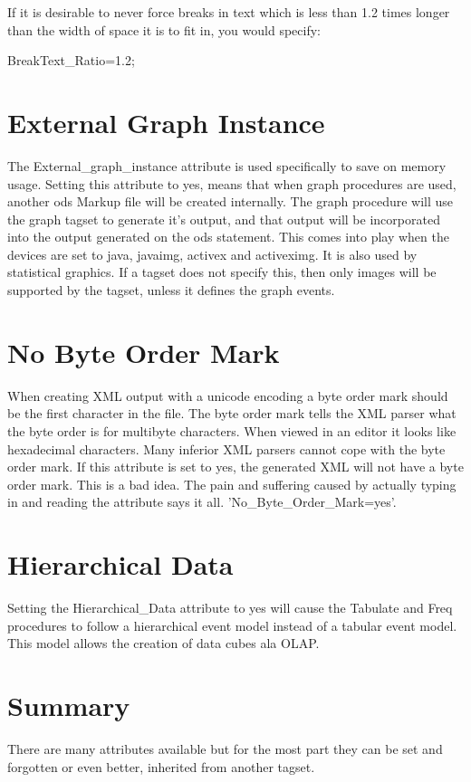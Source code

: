 If it is desirable to never force breaks in text which is less than 1.2 times longer
than the width of space it is to fit in, you would specify:

\begin{sfvcode}
    BreakText_Ratio=1.2;
\end{sfvcode}


\section{External Graph Instance}
The External\_graph\_instance attribute is used specifically to save on memory usage.
Setting this attribute to yes, means that when graph procedures are used, another
ods Markup file will be created internally.  The graph procedure will use the 
graph tagset to generate it's output, and that output will be incorporated into
the output generated on the ods statement.  This comes into play when the devices
are set to java, javaimg, activex and activeximg.  It is also used by statistical
graphics.  If a tagset does not specify this, then only images will be supported
by the tagset, unless it defines the graph events.  

\section{No Byte Order Mark}
When creating XML output with a unicode encoding a byte order mark should be the
first character in the file.  The byte order mark tells the XML parser what the
byte order is for multibyte characters.  When viewed in an editor it looks like
hexadecimal characters.  Many inferior XML parsers cannot cope with the byte order
mark.  If this attribute is set to yes, the generated XML will not have a byte order
mark.  This is a bad idea.  The pain and suffering caused by actually typing in
and reading the attribute says it all.  'No\_Byte\_Order\_Mark=yes'.

\section{Hierarchical Data}
Setting the Hierarchical\_Data attribute to yes will cause the Tabulate and Freq
procedures to follow a hierarchical event model instead of a tabular event model.
This model allows the creation of data cubes ala OLAP.

\section{Summary}
There are many attributes available but for the most part they can be set and forgotten
or even better, inherited from another tagset.  
